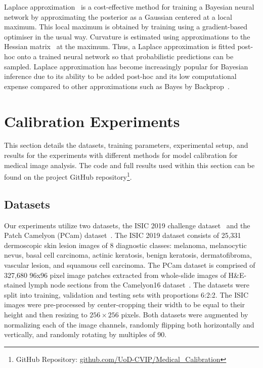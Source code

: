 Laplace approximation~\citep{mackay1992bayesian} is a cost-effective method for training a Bayesian neural network by approximating the posterior as a Gaussian centered at a local maximum. This local maximum is obtained by training using a gradient-based optimiser in the usual way. Curvature is estimated using approximations to the Hessian matrix~\citep{botev2017practical} at the maximum. Thus, a Laplace approximation is fitted post-hoc onto a trained neural network so that probabilistic predictions can be sampled. Laplace approximation has become increasingly popular for Bayesian inference due to its ability to be added post-hoc and its low computational expense compared to other approximations such as Bayes by Backprop~\citep{daxberger2021laplace}.



\section{Calibration Experiments}
\label{sec:calibration_experiments}
This section details the datasets, training parameters, experimental setup, and results for the experiments with different methods for model calibration for medical image analysis. The code and full results used within this section can be found on the project GitHub repository\footnote{GitHub Repository: \url{github.com/UoD-CVIP/Medical_Calibration}}.

\subsection{Datasets}
Our experiments utilize two datasets, the ISIC 2019 challenge dataset~\citep{codella2018skin,combalia2019bcn20000,tschandl2018ham10000} and the Patch Camelyon (PCam) dataset~\citep{veeling2018rotation}. The ISIC 2019 dataset consists of 25,331 dermoscopic skin lesion images of 8 diagnostic classes: melanoma, melanocytic nevus, basal cell carcinoma, actinic keratosis, benign keratosis, dermatofibroma, vascular lesion, and squamous cell carcinoma. The PCam dataset is comprised of 327,680 96x96 pixel image patches extracted from whole-slide images of H\&E-stained lymph node sections from the Camelyon16 dataset~\citep{bejnordi2017diagnostic}. The datasets were split into training, validation and testing sets with proportions 6:2:2. The ISIC images were pre-processed by center-cropping their width to be equal to their height and then resizing to $256 \times 256$ pixels. Both datasets were augmented by normalizing each of the image channels, randomly flipping both horizontally and vertically, and randomly rotating by multiples of 90\textdegree.


